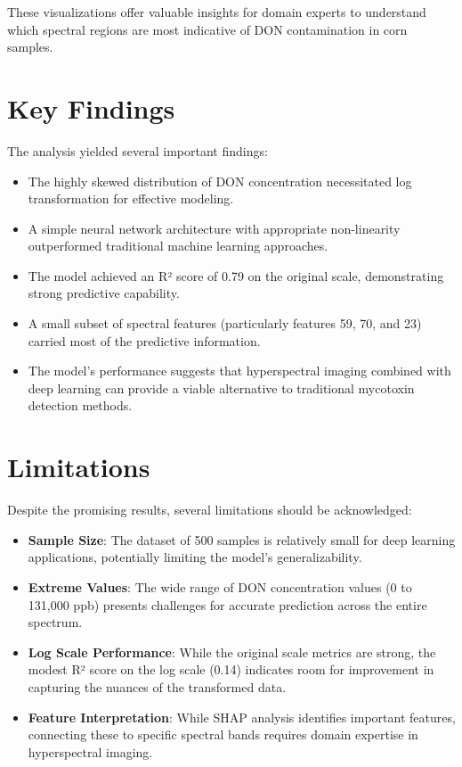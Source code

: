 \documentclass{article}
\begin{document}
These visualizations offer valuable insights for domain experts to understand which spectral regions are most indicative of DON contamination in corn samples.

\section{Key Findings}
The analysis yielded several important findings:

\begin{itemize}
    \item The highly skewed distribution of DON concentration necessitated log transformation for effective modeling.
    
    \item A simple neural network architecture with appropriate non-linearity outperformed traditional machine learning approaches.
    
    \item The model achieved an R² score of 0.79 on the original scale, demonstrating strong predictive capability.
    
    \item A small subset of spectral features (particularly features 59, 70, and 23) carried most of the predictive information.
    
    \item The model's performance suggests that hyperspectral imaging combined with deep learning can provide a viable alternative to traditional mycotoxin detection methods.
\end{itemize}

\section{Limitations}
Despite the promising results, several limitations should be acknowledged:

\begin{itemize}
    \item \textbf{Sample Size}: The dataset of 500 samples is relatively small for deep learning applications, potentially limiting the model's generalizability.
    
    \item \textbf{Extreme Values}: The wide range of DON concentration values (0 to 131,000 ppb) presents challenges for accurate prediction across the entire spectrum.
    
    \item \textbf{Log Scale Performance}: While the original scale metrics are strong, the modest R² score on the log scale (0.14) indicates room for improvement in capturing the nuances of the transformed data.
    
    \item \textbf{Feature Interpretation}: While SHAP analysis identifies important features, connecting these to specific spectral bands requires domain expertise in hyperspectral imaging.
\end{itemize}
\end{document}
